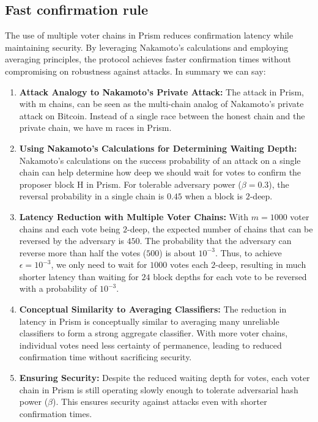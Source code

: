 \subsection{Fast confirmation rule}
The use of multiple voter chains in Prism reduces confirmation latency while maintaining security. By leveraging Nakamoto's calculations and employing averaging principles, the protocol achieves faster confirmation times without compromising on robustness against attacks. In summary we can say:
\begin{enumerate}
	\item \textbf{Attack Analogy to Nakamoto's Private Attack:} The attack in Prism, with m chains, can be seen as the multi-chain analog of Nakamoto's private attack on Bitcoin. Instead of a single race between the honest chain and the private chain, we have m races in Prism.
	\item \textbf{Using Nakamoto's Calculations for Determining Waiting Depth:} Nakamoto's calculations on the success probability of an attack on a single chain can help determine how deep we should wait for votes to confirm the proposer block H in Prism. For tolerable adversary power ($\beta = 0.3$), the reversal probability in a single chain is $0.45$ when a block is $2$-deep.
	\item \textbf{Latency Reduction with Multiple Voter Chains:} With $m = 1000$ voter chains and each vote being $2$-deep, the expected number of chains that can be reversed by the adversary is $450$. The probability that the adversary can reverse more than half the votes ($500$) is about $10^{-3}$. Thus, to achieve $\epsilon = 10^{-3}$, we only need to wait for $1000$ votes each $2$-deep, resulting in much shorter latency than waiting for $24$ block depths for each vote to be reversed with a probability of $10^{-3}$.
	\item \textbf{Conceptual Similarity to Averaging Classifiers:} The reduction in latency in Prism is conceptually similar to averaging many unreliable classifiers to form a strong aggregate classifier. With more voter chains, individual votes need less certainty of permanence, leading to reduced confirmation time without sacrificing security.
	\item \textbf{Ensuring Security:} Despite the reduced waiting depth for votes, each voter chain in Prism is still operating slowly enough to tolerate adversarial hash power ($\beta$). This ensures security against attacks even with shorter confirmation times.
\end{enumerate}
